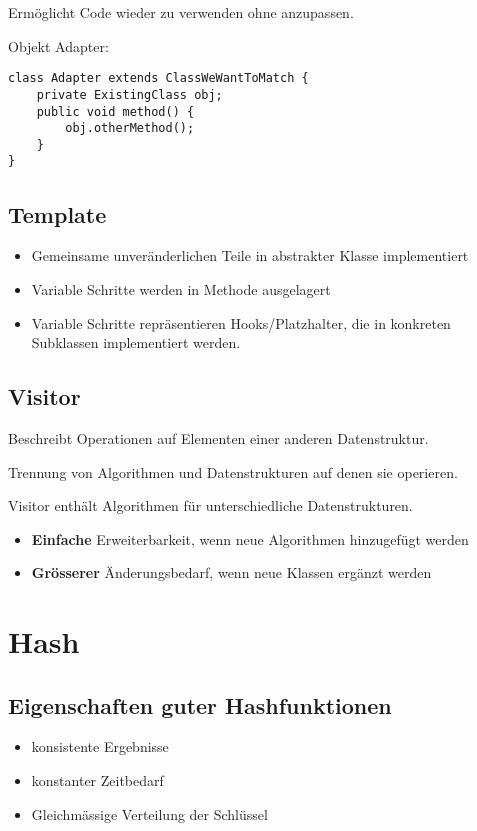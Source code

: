 \begin{multicols*}{4}
	Ermöglicht Code wieder zu verwenden ohne anzupassen.
	
	Objekt Adapter:
	\begin{lstlisting}
class Adapter extends ClassWeWantToMatch {
	private ExistingClass obj;
	public void method() {
		obj.otherMethod();
	}
}
	\end{lstlisting}

	\subsection{Template}
	\begin{itemize}
		\item Gemeinsame unveränderlichen Teile in abstrakter Klasse implementiert
		\item Variable Schritte werden in Methode ausgelagert
		\item Variable Schritte repräsentieren Hooks/Platzhalter, die in konkreten Subklassen implementiert werden.
	\end{itemize}

	\subsection{Visitor}
	Beschreibt Operationen auf Elementen einer anderen Datenstruktur.
	
	Trennung von Algorithmen und Datenstrukturen auf denen sie operieren. 
	
	Visitor enthält Algorithmen für unterschiedliche Datenstrukturen.
	\begin{itemize}
		\item \textbf{Einfache} Erweiterbarkeit, wenn neue Algorithmen hinzugefügt werden
		\item \textbf{Grösserer} Änderungsbedarf, wenn neue Klassen ergänzt werden
	\end{itemize}

\section{Hash}

	\subsection{Eigenschaften guter Hashfunktionen}
	\begin{itemize}
		\item konsistente Ergebnisse
		\item konstanter Zeitbedarf
		\item Gleichmässige Verteilung der Schlüssel
	\end{itemize}


\end{multicols*}

